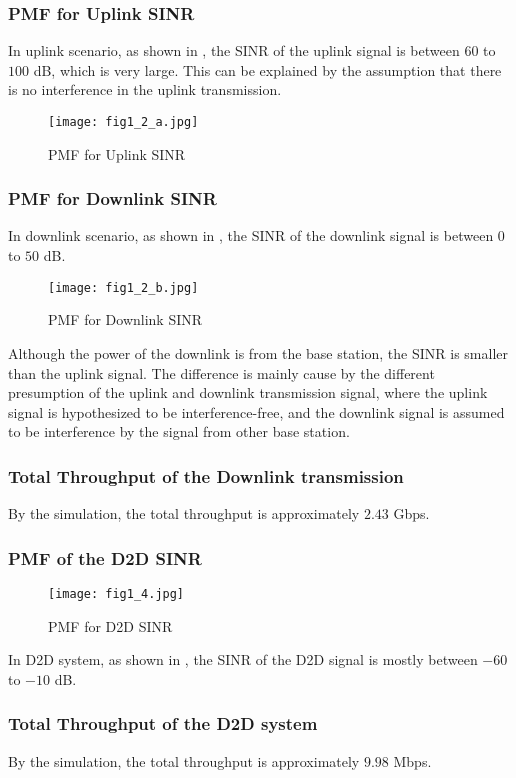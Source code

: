 \documentclass[conference]{IEEEtran}
\begin{document}
\subsubsection{PMF for Uplink SINR}
In uplink scenario, as shown in , the SINR of the uplink signal is between $60$ to $100$ dB, which is very large. This can be explained by the assumption that there is no interference in the uplink transmission. 
\begin{figure}[htbp]
    \centering
    \texttt{[image: fig1\_2\_a.jpg]}
    \caption{PMF for Uplink SINR}
    \label{fig:uplink_sinr}
\end{figure}

\subsubsection{PMF for Downlink SINR}
In downlink scenario, as shown in , the SINR of the downlink signal is between $0$ to $50$ dB. 


\begin{figure}[htbp]
    \centering
    \texttt{[image: fig1\_2\_b.jpg]}
    \caption{PMF for Downlink SINR}
    \label{fig:downlink_sinr}
\end{figure}
Although the power of the downlink is from the base station, the SINR is smaller than the uplink signal. The difference is mainly cause by the different presumption of the uplink and downlink transmission signal, where the uplink signal is hypothesized to be interference-free, and the downlink signal is assumed to be interference by the signal from other base station.
\subsubsection{Total Throughput of the Downlink transmission}
By the simulation, the total throughput is approximately $2.43$ Gbps.
\subsubsection{PMF of the D2D SINR}

\begin{figure}[htbp]
    \centering
    \texttt{[image: fig1\_4.jpg]}
    \caption{PMF for D2D SINR}
    \label{fig:d2d_sinr}
\end{figure}
In D2D system, as shown in , the SINR of the D2D signal is mostly between $-60$ to $-10$ dB. 
\subsubsection{Total Throughput of the D2D system}
By the simulation, the total throughput is approximately $9.98$ Mbps.
\end{document}
